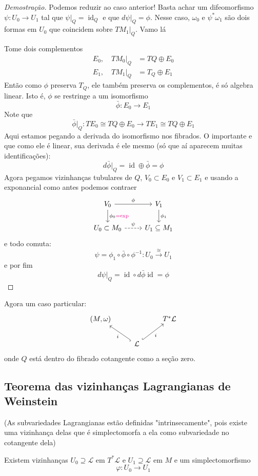 \begin{proof}[Demostra\c c\~ao]
	Podemos reduzir ao caso anterior! Basta achar um difeomorfismo $\psi:U_0\to U_1$ tal que $\psi|_{Q}=\operatorname{id}_Q$ e que $d\psi|_{Q}=\phi$. Nesse caso, $\omega_0$ e $\psi^*\omega_1$ s\~ao dois formas em $U_0$ que coincidem sobre $TM_1|_{Q}$. Vamo l\'a

	Tome dois complementos
	 \begin{align*}
		E_0,\quad TM_0|_{Q}&=TQ\oplus E_0\\
		E_1,\quad TM_1|_{Q}&=T_Q\oplus E_1
	\end{align*}
	Ent\~ao como $\phi$ preserva $T_Q$, ele tamb\'em preserva os complementos, \'e s\'o algebra linear. Isto \'e, $\phi$ se restringe a um isomorfismo
	\[\bar{\phi} :E_0\to E_1\]
	Note que
	\[ \bar{\phi}|_{Q} :TE_0\cong TQ\oplus E_0\to TE_1\cong TQ\oplus E_1\]
	Aqui estamos pegando a derivada do isomorfismo nos fibrados. O importante e que como ele \'e linear, sua derivada \'e ele mesmo (s\'o que a\'i aparecem muitas identifica\c c\~oes):
	\[d\bar{\phi}|_{Q}=\operatorname{id}\oplus \bar{\phi} =\phi\]
Agora pegamos vizinhanças tubulares de $Q$, $V_0\subset E_0$ e $V_1\subset E_1$ e usando a exponancial como antes podemos contraer
\[\begin{tikzcd}
	V_0\arrow[r,"\phi"]\arrow[d,"\phi_0{\color{magenta}= \operatorname{exp}}"]&V_1\arrow[d,"\phi_1"]\\
	U_0\subset M_0\arrow[r,"\psi",dashed]&U_1\subseteq M_1
\end{tikzcd}\]
e todo comuta:
\[\psi=\phi_1\circ \bar{\phi} \circ \phi^{-1}:U_0\overset{\cong }{\longrightarrow} U_1\]
e por fim
\[d\psi|_{Q}=\operatorname{id}\circ d \bar{\phi} \operatorname{id}=\phi\]
\end{proof}

Agora um caso particular:
\[\begin{tikzcd}
	(M,\omega)&&T^*\mathcal{L}\\
&\mathcal{L}\arrow[ul,hook,"i"]\arrow[ur,"i",swap,hook]
\end{tikzcd}\]
onde $Q$ est\'a dentro do fibrado cotangente como a se\c c\~ao zero.

\subsection{Teorema das vizinhanças Lagrangianas de Weinstein}


\begin{thm}\leavevmode
	(As subvariedades Lagrangianas est\~ao definidas "intrinsecamente", pois existe uma vizinhança delas que \'e simplectomorfa a ela como subvariedade no cotangente dela)

	Existem vizinhanças $U_0\supseteq \mathcal{L}$ em $T^*\mathcal{L}$ e $U_1\supseteq \mathcal{L}$ em $M$ e um simplectomorfismo
	\[\varphi:U_0\to U_1\]
\end{thm}

